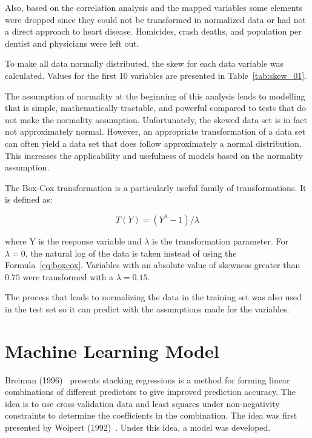 \documentclass[
10pt, %
a4paper, %
oneside, %
headinclude,footinclude, %
BCOR5mm, %
]{scrartcl}
\begin{document}
Also, based on the correlation analysis and the mapped variables some elements were dropped since they could not be transformed in normalized data or had not a direct approach to heart disease. Homicides, crash deaths, and population per dentist and physicians were left out.

To make all data normally distributed, the skew for each data variable was calculated. Values for the first 10 variables are presented in Table~\ref{tab:skew_01}. 



The assumption of normality at the beginning of this analysis leads to modelling that is simple, mathematically tractable, and powerful compared to tests that do not make the normality assumption. Unfortunately, the skewed data set is in fact not approximately normal. However, an appropriate transformation of a data set can often yield a data set that does follow approximately a normal distribution. This increases the applicability and usefulness of models based on the normality assumption.

The Box-Cox transformation is a particularly useful family of transformations. It is defined as:

\begin{equation}
T(Y) = (Y^{\lambda} - 1)/\lambda
\label{eq:boxcox}
\end{equation}

where Y is the response variable and $\lambda$ is the transformation parameter. For $\lambda = 0$, the natural log of the data is taken instead of using the Formula~\ref{eq:boxcox}. Variables with an absolute value of skewness greater than $0.75$ were transformed with a $\lambda = 0.15$.

The process that leads to normalizing the data in the training set was also used in the test set so it can predict with the assumptions made for the variables.


\section{Machine Learning Model}

Breiman (1996)~\cite{Breiman1996} presents stacking regressions is a method for forming linear combinations of different predictors to give improved prediction accuracy. The idea is to use cross-validation data and least squares under non-negativity constraints to determine the coefficients in the combination. The idea was first presented by Wolpert (1992)~\cite{Wolpert1992}. Under this idea, a model was developed.
\end{document}
